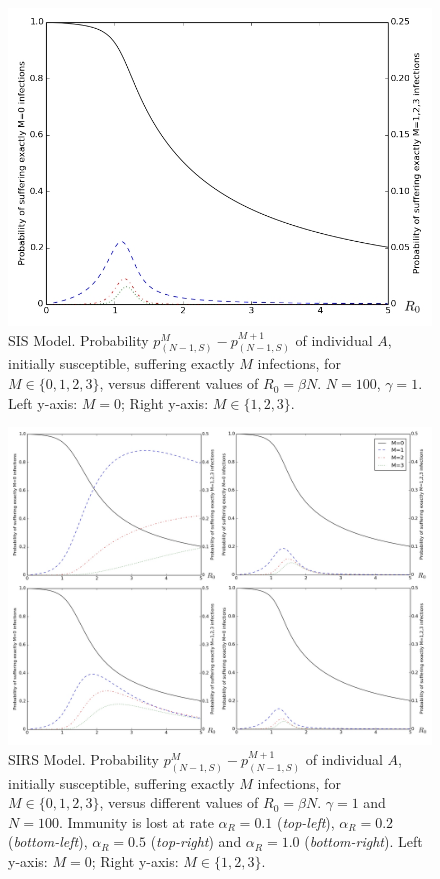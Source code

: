 \documentclass[preprint,12pt]{elsarticle}
\begin{document}
\begin{figure}[h!]
  \centering
 \includegraphics[width=\textwidth]{SIS_Homogeneous.jpg}
 \caption{SIS Model. Probability $p_{(N-1,S)}^M-p_{(N-1,S)}^{M+1}$ of individual $A$, initially susceptible, suffering exactly $M$ infections, for $M\in\{0,1,2,3\}$, versus different values of $R_0=\beta N$. $N=100$, $\gamma=1$. Left y-axis: $M=0$; Right y-axis: $M\in\{1,2,3\}$.}
  \label{fig:sis_homogeneous}
\end{figure}

\begin{figure}[h!]
  \centering
 \includegraphics[width=\textwidth]{SIRS.jpg}
 \caption{SIRS Model. Probability $p_{(N-1,S)}^M-p_{(N-1,S)}^{M+1}$ of individual $A$, initially susceptible, suffering exactly $M$ infections, for $M\in\{0,1,2,3\}$, versus different values of $R_0=\beta N$. $\gamma=1$ and $N=100$. Immunity is lost at rate
$\alpha_R=0.1$ ({\it top-left}), $\alpha_R=0.2$ ({\it bottom-left}), $\alpha_R=0.5$ ({\it top-right}) and $\alpha_R=1.0$ ({\it bottom-right}).
Left y-axis: $M=0$; Right y-axis: $M\in\{1,2,3\}$.}
  \label{fig:sirs}
\end{figure}
\end{document}
